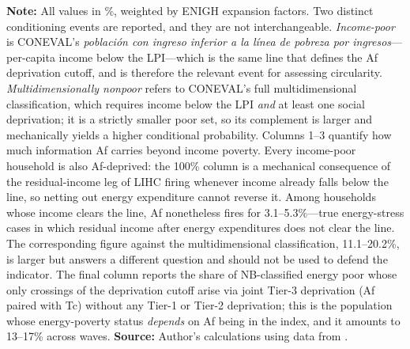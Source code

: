 \documentclass[11pt, a4paper]{article}
\begin{document}
\begin{table}[htb]
\begin{justify}
\textbf{Note:} All values in \%, weighted by ENIGH expansion factors. Two distinct conditioning events are reported, and they are not interchangeable. \emph{Income-poor} is CONEVAL's \textit{población con ingreso inferior a la línea de pobreza por ingresos}---per-capita income below the LPI---which is the same line that defines the Af deprivation cutoff, and is therefore the relevant event for assessing circularity. \emph{Multidimensionally nonpoor} refers to CONEVAL's full multidimensional classification, which requires income below the LPI \emph{and} at least one social deprivation; it is a strictly smaller poor set, so its complement is larger and mechanically yields a higher conditional probability. Columns 1--3 quantify how much information Af carries beyond income poverty. Every income-poor household is also Af-deprived: the 100\% column is a mechanical consequence of the residual-income leg of LIHC firing whenever income already falls below the line, so netting out energy expenditure cannot reverse it. Among households whose income clears the line, Af nonetheless fires for 3.1--5.3\%---true energy-stress cases in which residual income after energy expenditures does not clear the line. The corresponding figure against the multidimensional classification, 11.1--20.2\%, is larger but answers a different question and should not be used to defend the indicator. The final column reports the share of NB-classified energy poor whose only crossings of the deprivation cutoff arise via joint Tier-3 deprivation (Af paired with Tc) without any Tier-1 or Tier-2 deprivation; this is the population whose energy-poverty status \emph{depends} on Af being in the index, and it amounts to 13--17\% across waves. \textbf{Source:} Author's calculations using data from \textcite{enigh2016, enigh2018, enigh2020, enigh2022, enigh2024}.
\end{justify}
\label{tab:af_circ}
\end{table}
\end{document}
